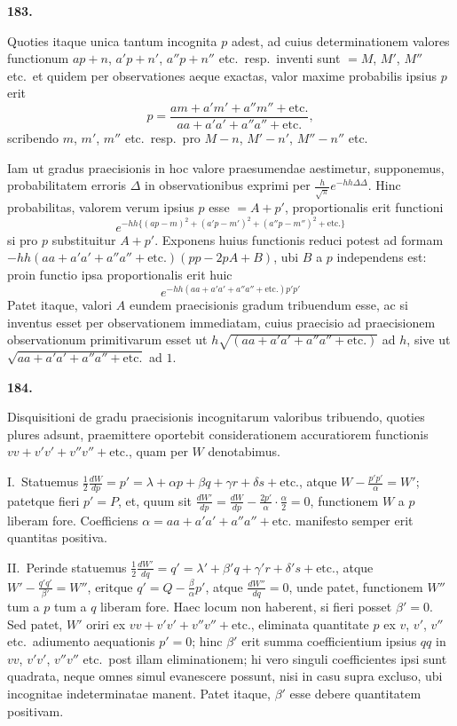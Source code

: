 \documentclass[11pt,a4paper]{article}
\begin{document}
\newpage
\setcounter{page}{255}

\noindent\textbf{183.}

Quoties itaque unica tantum incognita $p$ adest, ad cuius determinationem valores functionum $ap+n$, $a'p+n'$, $a''p+n''$ etc.\ resp.\ inventi sunt $= M$, $M'$, $M''$ etc.\ et quidem per observationes aeque exactas, valor maxime probabilis ipsius $p$ erit
\[
p = \frac{am + a'm' + a''m'' + \text{etc.}}{aa + a'a' + a''a'' + \text{etc.}},
\]
scribendo $m$, $m'$, $m''$ etc.\ resp.\ pro $M-n$, $M'-n'$, $M''-n''$ etc.

Iam ut gradus praecisionis in hoc valore praesumendae aestimetur, supponemus, probabilitatem erroris $\Delta$ in observationibus exprimi per $\frac{h}{\sqrt{\pi}}e^{-hh\Delta\Delta}$. Hinc probabilitas, valorem verum ipsius $p$ esse $= A+p'$, proportionalis erit functioni
\[
e^{-hh\{(ap-m)^2 + (a'p-m')^2 + (a''p-m'')^2 + \text{etc.}\}}
\]
si pro $p$ substituitur $A+p'$. Exponens huius functionis reduci potest ad formam $-hh(aa+a'a'+a''a''+\text{etc.})(pp - 2pA + B)$, ubi $B$ a $p$ independens est: proin functio ipsa proportionalis erit huic
\[
e^{-hh(aa+a'a'+a''a''+\text{etc.})p'p'}
\]
Patet itaque, valori $A$ eundem praecisionis gradum tribuendum esse, ac si inventus esset per observationem immediatam, cuius praecisio ad praecisionem observationum primitivarum esset ut $h\sqrt{(aa+a'a'+a''a''+\text{etc.})}$ ad $h$, sive ut $\sqrt{aa+a'a'+a''a''+\text{etc.}}$ ad $1$.

\vspace{1em}

\noindent\textbf{184.}

Disquisitioni de gradu praecisionis incognitarum valoribus tribuendo, quoties plures adsunt, praemittere oportebit considerationem accuratiorem functionis $vv + v'v' + v''v'' + \text{etc.}$, quam per $W$ denotabimus.

I.\ Statuemus $\frac{1}{2}\frac{dW}{dp} = p' = \lambda + \alpha p + \beta q + \gamma r + \delta s + \text{etc.}$, atque $W - \frac{p'p'}{\alpha} = W'$; patetque fieri $p' = P$, et, quum sit $\frac{dW'}{dp} = \frac{dW}{dp} - \frac{2p'}{\alpha} \cdot \frac{\alpha}{2} = 0$, functionem $W$ a $p$ liberam fore. Coefficiens $\alpha = aa + a'a' + a''a'' + \text{etc.}$ manifesto semper erit quantitas positiva.

II.\ Perinde statuemus $\frac{1}{2}\frac{dW'}{dq} = q' = \lambda' + \beta'q + \gamma'r + \delta's + \text{etc.}$, atque $W' - \frac{q'q'}{\beta'} = W''$, eritque $q' = Q - \frac{\beta}{\alpha}p'$, atque $\frac{dW''}{dq} = 0$, unde patet, functionem $W''$ tum a $p$ tum a $q$ liberam fore. Haec locum non haberent, si fieri posset $\beta' = 0$. Sed patet, $W'$ oriri ex $vv + v'v' + v''v'' + \text{etc.}$, eliminata quantitate $p$ ex $v$, $v'$, $v''$ etc.\ adiumento aequationis $p' = 0$; hinc $\beta'$ erit summa coefficientium ipsius $qq$ in $vv$, $v'v'$, $v''v''$ etc.\ post illam eliminationem; hi vero singuli coefficientes ipsi sunt quadrata, neque omnes simul evanescere possunt, nisi in casu supra excluso, ubi incognitae indeterminatae manent. Patet itaque, $\beta'$ esse debere quantitatem positivam.
\end{document}
